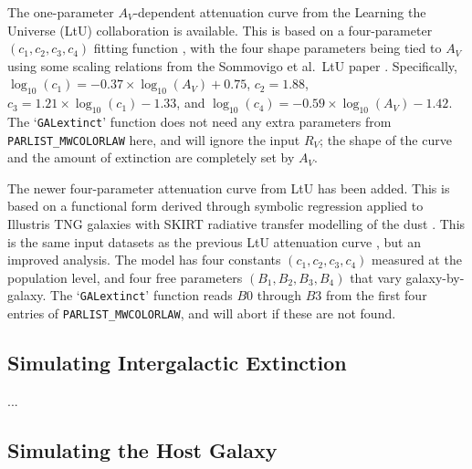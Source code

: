 \documentclass[12pt]{article}
\begin{document}
{The one-parameter $A_V$-dependent attenuation curve from the Learning the
Universe (LtU) collaboration \cite{Sommovigo2025} is available. This is based
on a four-parameter $(c_1, c_2, c_3, c_4)$ fitting function \cite{Pei1992, Li2008},
with the four shape parameters being tied to $A_V$ using some scaling relations
from the Sommovigo et al.\ LtU paper \cite{Sommovigo2025}. 
Specifically, $\log_{10}(c_1)=-0.37\times\log_{10}(A_V) + 0.75$, $c_2=1.88$, 
$c_3 = 1.21\times\log_{10}(c_1) - 1.33$, 
and $\log_{10}(c_4) = -0.59\times\log_{10}(A_V) - 1.42$.
The `\texttt{GALextinct}' function does not need any extra parameters from 
\verb!PARLIST_MWCOLORLAW! here, and will ignore the input $R_V$; the shape of 
the curve and the amount of extinction are completely set by $A_V$.

The newer four-parameter attenuation curve from LtU \cite{Sommovigo2026} has been added.
This is based on a functional form derived through symbolic regression applied to
Illustris TNG \cite{Pillepich2018, Pillepich2019} galaxies with SKIRT radiative transfer modelling of the dust \cite{Camps2015, Camps2020}. This is the same input datasets as the previous LtU attenuation curve \cite{Sommovigo2025}, but an improved analysis. The model
has four constants $(c_1, c_2, c_3, c_4)$ measured at the population level, and four
free parameters $(B_1, B_2, B_3, B_4)$ that vary galaxy-by-galaxy. 
The `\texttt{GALextinct}' function reads $B0$ through $B3$ from the first four entries of 
\verb!PARLIST_MWCOLORLAW!, and will abort if these are not found.



\subsection{Simulating Intergalactic Extinction}
\label{sss:IGM}

...


\clearpage
\subsection{Simulating the Host Galaxy}
\label{subsec:hostlib}

}
\end{document}
